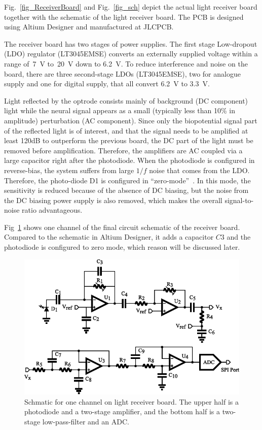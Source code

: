 Fig.~\ref{fig_ReceiverBoard} and Fig.~\ref{fig_sch} depict the actual light receiver board together with the schematic of the light receiver board.  The PCB is designed using Altium Designer and manufactured at JLCPCB.

The receiver board has two stages of power supplies.  The first stage Low-dropout (LDO) regulator (LT3045EMSE) converts an externally supplied voltage within a range of~\qty{7}{V} to~\qty{20}{V} down to \qty{6.2}{V}.  To reduce interference and noise on the board, there are three second-stage LDOs (LT3045EMSE), two for analogue supply and one for digital supply, that all convert \qty{6.2}{V} to \qty{3.3}{V}.

Light reflected by the optrode consists mainly of background (DC component) light while the neural signal appears as a small (typically less than 10\% in amplitude) perturbation (AC component). Since only the biopotential signal part of the reflected light is of interest, and that the signal needs to be amplified at least 120dB to outperform the previous board, the DC part of the light must be removed before amplification.  Therefore, the amplifiers are AC coupled via a large capacitor right after the photodiode. When the photodiode is configured in reverse-bias, the system suffers from large $1/f$ noise that comes from the LDO. Therefore, the photo-diode D1 is configured in ``zero-mode''~\cite{zero-mode_detection}.  In this mode, the sensitivity is reduced because of the absence of DC biasing, but the noise from the DC biasing power supply is also removed, which makes the overall signal-to-noise ratio advantageous.

Fig~\ref{fig_ReceiverSch} shows one channel of the final circuit schematic of the receiver board.  Compared to the schematic in Altium Designer, it adds a capacitor $C3$ and the photodiode is configured to zero mode, which reason will be discussed later.

\begin{figure}[htbp]
\centerline{\includegraphics[scale=0.8]{4-ANC_Sys/ReceiverSch.pdf}}
\caption{Schmatic for one channel on light receiver board.  The upper half is a photodiode and a two-stage amplifier, and the bottom half is a two-stage low-pass-filter and an ADC.}
\label{fig_ReceiverSch}
\end{figure}

